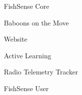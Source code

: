 \item FishSense Core
\item Baboons on the Move
\item Website
\item Active Learning
\item Radio Telemetry Tracker
\item FishSense User
